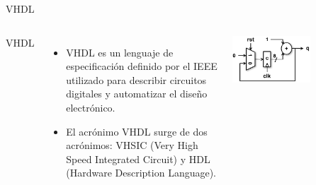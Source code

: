 \begin{frame}{VHDL}
\begin{columns}
	
\begin{block}{VHDL}

			
\end{block}
	\begin{itemize}
\item VHDL es un lenguaje de especificación definido por el IEEE utilizado para describir circuitos digitales y automatizar el diseño electrónico. 
\item El acrónimo VHDL surge de dos acrónimos: VHSIC (Very High Speed Integrated Circuit) y HDL (Hardware Description Language).	
	\end{itemize}
        \begin{center}
        \includegraphics[width=0.6\textwidth]{Figs/Registro_8Bits}
        \end{center}	
	  
\end{columns}
\end{frame}

